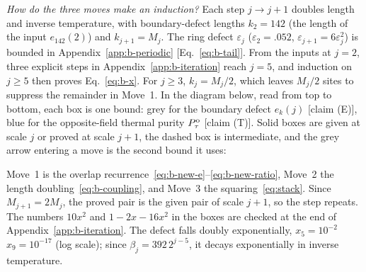 \documentclass[aps,prl,reprint,amsmath,amssymb,nofootinbib,raggedbottom]{revtex4-2}
\begin{document}
\emph{How do the three moves make an induction?} Each step $j\to j+1$ doubles
length and inverse temperature, with boundary-defect lengths $k_2=142$ (the
length of the input $e_{142}(2)$) and $k_{j+1}=M_j$. The ring defect
$\varepsilon_j$ ($\varepsilon_2=.052$, $\varepsilon_{j+1}=6\varepsilon_j^2$) is
bounded in Appendix~\ref{app:b-periodic} [Eq.~\eqref{eq:b-tail}]. From the
inputs at $j=2$, three explicit steps in Appendix~\ref{app:b-iteration} reach
$j=5$, and induction on $j\ge5$ then proves Eq.~\eqref{eq:b-x}. For $j\ge3$,
$k_j=M_j/2$, which leaves $M_j/2$ sites to suppress the remainder in Move~1.
In the diagram below, read from top to bottom, each box is one bound: grey for
the boundary defect $e_k(j)$ [claim (E)], blue for the opposite-field thermal
purity $P_{\tau}^{\mathrm{o}}$ [claim (T)]. Solid boxes are given at scale $j$ or proved
at scale $j+1$, the dashed box is intermediate, and the grey arrow entering a
move is the second bound it uses:
\begin{proofdiagram}
\begin{prooflanes}
  
  
  
  
\end{prooflanes}
\end{proofdiagram}
Move~1 is the overlap recurrence~\eqref{eq:b-new-e}--\eqref{eq:b-new-ratio},
Move~2 the length doubling~\eqref{eq:b-coupling}, and Move~3 the
squaring~\eqref{eq:stack}. Since $M_{j+1}=2M_j$, the proved pair is the given
pair of scale $j+1$, so the step repeats. The numbers $10x^2$ and
$1-2x-16x^2$ in the boxes are checked at the end of
Appendix~\ref{app:b-iteration}. The defect falls
doubly exponentially,
$x_5=10^{-2}$\,\,$x_9=10^{-17}$ (log
scale); since $\beta_j=392\,2^{j-5}$, it decays exponentially in inverse
temperature.
\end{document}
